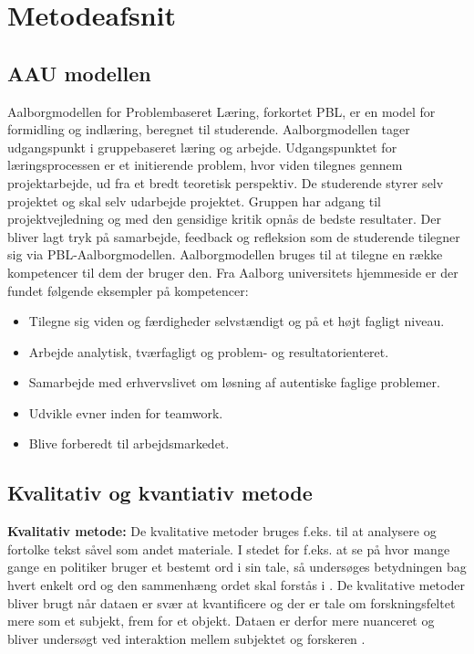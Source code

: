 \chapter{Metodeafsnit}
\section{AAU modellen}
Aalborgmodellen for Problembaseret Læring, forkortet PBL, er en model for formidling og indlæring, beregnet til studerende. Aalborgmodellen tager udgangspunkt i gruppebaseret læring og arbejde. Udgangspunktet for læringsprocessen er et initierende problem, hvor viden tilegnes gennem projektarbejde, ud fra et bredt teoretisk perspektiv. De studerende styrer selv projektet og skal selv udarbejde projektet. Gruppen har adgang til projektvejledning og med den gensidige kritik opnås de bedste resultater. Der bliver lagt tryk på samarbejde, feedback og refleksion som de studerende tilegner sig via PBL-Aalborgmodellen.
Aalborgmodellen bruges til at tilegne en række kompetencer til dem der bruger den. Fra Aalborg universitets hjemmeside er der fundet følgende eksempler på kompetencer:
\begin{itemize}
\item {Tilegne sig viden og færdigheder selvstændigt og på et højt fagligt niveau.}
\item {Arbejde analytisk, tværfagligt og problem- og resultatorienteret.}
\item {Samarbejde med erhvervslivet om løsning af autentiske faglige problemer.}
\item {Udvikle evner inden for teamwork.}
\item {Blive forberedt til arbejdsmarkedet.}
\end{itemize}
\citep{Universitet2015}\citep{Universitet2011}

\section{Kvalitativ og kvantiativ metode}
\textbf{Kvalitativ metode:}
De kvalitative metoder bruges f.eks. til at analysere og fortolke tekst såvel som andet materiale. I stedet for f.eks. at se på hvor mange gange en politiker bruger et bestemt ord i sin tale, så undersøges betydningen bag hvert enkelt ord og den sammenhæng ordet skal forstås i \citep{Gymportalen}. De kvalitative metoder bliver brugt når dataen er svær at kvantificere og der er tale om forskningsfeltet mere som et subjekt, frem for et objekt. Dataen er derfor mere nuanceret og bliver undersøgt ved interaktion mellem subjektet og forskeren \citep{Kval}.\\ 

